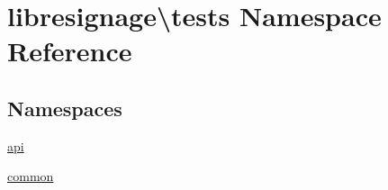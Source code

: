 \hypertarget{namespacelibresignage_1_1tests}{}\section{libresignage\textbackslash{}tests Namespace Reference}
\label{namespacelibresignage_1_1tests}
\subsection*{Namespaces}
\begin{DoxyCompactItemize}
\item 
 \hyperlink{namespacelibresignage_1_1tests_1_1api}{api}
\item 
 \hyperlink{namespacelibresignage_1_1tests_1_1common}{common}
\end{DoxyCompactItemize}
